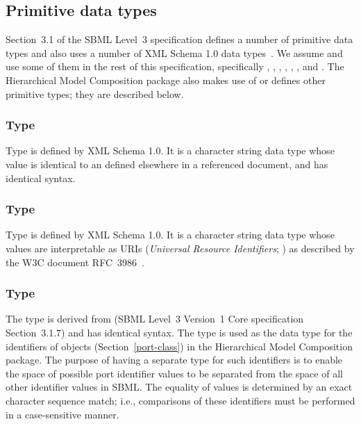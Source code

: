 \subsection{Primitive data types}
\label{new-primitive-types}

Section~3.1 of the SBML Level~3 specification defines a number of
primitive data types and also uses a number of XML Schema 1.0 data
types~\citep{biron:2000}.  We assume and use some of them in the rest of
this specification, specifically , ,
, , ,
, and .  The Hierarchical Model
Composition package also makes use of or defines other primitive types;
they are described below.


\subsubsection{Type \fixttspace{}}
\label{primtype-idref}

Type  is defined by XML Schema 1.0.  It is a character
string data type whose value is identical to an  defined 
elsewhere in a referenced document, and has identical syntax.


\subsubsection{Type \fixttspace{}}
\label{primtype-anyuri}
\label{primtype-uri}

Type  is defined by XML Schema 1.0.  It is a character
string data type whose values are interpretable as URIs (\emph{Universal
  Resource Identifiers}; \citealt{harold:2001,w3c:2000}) as described by
the W3C document RFC~3986~\citep{rfc3986}.


\subsubsection{Type \fixttspace{}}
\label{primtype-portid}

The type  is derived from  (SBML Level~3
Version~1 Core specification Section~3.1.7) and has identical syntax.
The  type is used as the data type for the identifiers
of \Port objects (Section~\ref{port-class}) in the Hierarchical Model Composition
package.  The purpose of having a separate type for such identifiers is
to enable the space of possible port identifier values to be separated
from the space of all other identifier values in SBML.  The equality of
 values is determined by an exact character sequence
match; i.e., comparisons of these identifiers must be performed in a
case-sensitive manner.


